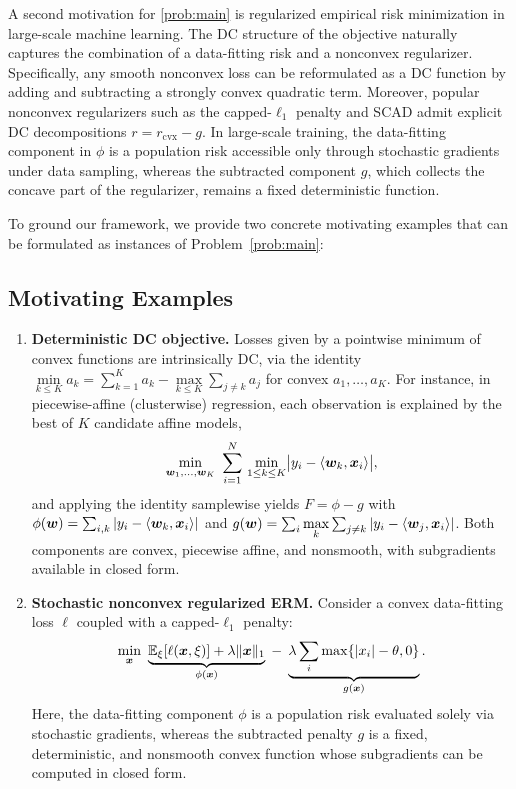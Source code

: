 A second motivation for \eqref{prob:main} is regularized empirical risk minimization in large-scale machine learning. The DC structure of the objective naturally captures the combination of a data-fitting risk and a nonconvex regularizer. Specifically, any smooth nonconvex loss can be reformulated as a DC function by adding and subtracting a strongly convex quadratic term. Moreover, popular nonconvex regularizers such as the capped-$\ell_1$ penalty \citep{zhang2010analysis} and SCAD \citep{fan2001variable} admit explicit DC decompositions $r = r_{\mathrm{cvx}} - g$. In large-scale training, the data-fitting component in $\phi$ is a
population risk accessible only through stochastic gradients under
data sampling, whereas the subtracted component $g$, which collects
the concave part of the regularizer, remains a fixed deterministic
function. 

To ground our framework, we provide two concrete motivating examples that can be formulated as instances of Problem~\eqref{prob:main}:

\subsection{Motivating Examples}

\begin{enumerate}
  \item \textbf{Deterministic DC objective.}
Losses given by a pointwise minimum of convex functions are
intrinsically DC, via the identity
$\min\limits_{k\le K} a_k=\sum_{k=1}^{K}a_k-\max\limits_{k\le K}\sum_{j\ne k}a_j$
for convex $a_1,\dots,a_K$. For instance, in piecewise-affine
(clusterwise) regression, each observation is explained by the best of
$K$ candidate affine models,
\[
   \min\limits_{\bm{w}_1,\dots,\bm{w}_K}\ \sum_{i=1}^{N}\,
   \min\limits_{1\le k\le K}\bigl|y_i-\langle \bm{w}_k,\bm{x}_i\rangle\bigr|,
\]
and applying the identity samplewise yields $F=\phi-g$ with
$\phi(\bm{w})=\sum_{i,k}|y_i-\langle \bm{w}_k,\bm{x}_i\rangle|$ and
$g(\bm{w})=\sum_{i}\max\limits_{k}\sum_{j\ne k}|y_i-\langle \bm{w}_j,\bm{x}_i\rangle|$.
Both components are convex, piecewise affine, and nonsmooth, with
subgradients available in closed form.

  \item \textbf{Stochastic nonconvex regularized ERM.}
  Consider a convex data-fitting loss $\ell$ coupled with a capped-$\ell_1$ penalty:
  \[
     \min\limits_{\bx}\ \underbrace{\EE_{\xi}[\ell(\bx,\xi)] + \lambda\|\bx\|_1}_{\phi(\bx)}
     \;-\;\underbrace{\lambda\sum_i\max\limits\{|x_i|-\theta,0\}}_{g(\bx)}.
  \]
  Here, the data-fitting component $\phi$ is a population risk evaluated solely via stochastic gradients, whereas the subtracted penalty $g$ is a fixed, deterministic, and nonsmooth convex function whose subgradients can be computed in closed form.
\end{enumerate}

